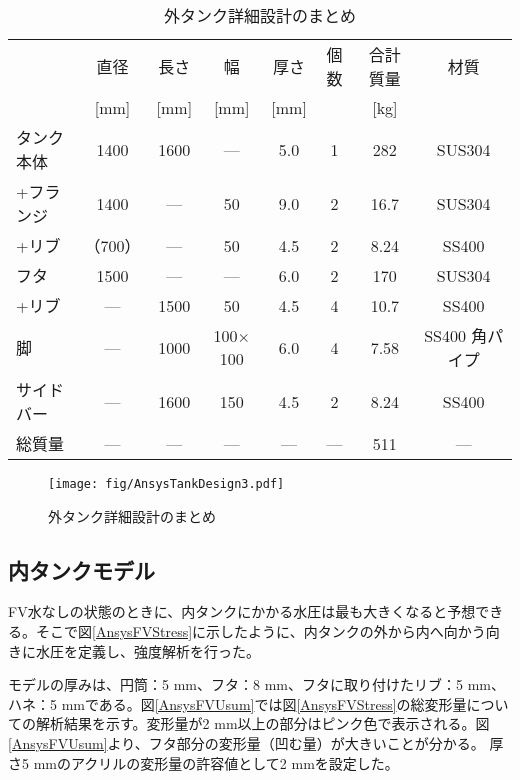 \documentclass[11pt]{ltjsreport}
\newcommand{\figref}[1]{図\ref{#1}}
\begin{document}
\begin{table}[!h]
\caption[外タンク詳細設計のまとめ]{外タンク詳細設計のまとめ}
\begin{center}
\begin{tabular}{lccccccc}
\hline \hline
& 直径 & 長さ & 幅 & 厚さ & 個数 & 合計質量 & 材質 \\
& [mm] & [mm] & [mm] & [mm] &  & [kg] &  \\
\hline
タンク本体 & 1400 & 1600 & --- & 5.0 & 1 & 282 &  SUS304\\
+フランジ & 1400 & --- & 50 & 9.0 & 2 & 16.7 & SUS304\\
+リブ & （700）& --- & 50 & 4.5 & 2 & 8.24 &SS400\\
\hline
フタ & 1500 & --- & --- & 6.0 & 2 & 170 & SUS304 \\
+リブ & --- & 1500 & 50 & 4.5 & 4 & 10.7& SS400\\
\hline
脚 & --- & 1000 & 100$\times$100 & 6.0 & 4 & 7.58 & SS400 角パイプ\\
サイドバー & --- & 1600 & 150 & 4.5 & 2 & 8.24 & SS400\\
\hline
総質量 & --- & --- & --- & --- & --- & 511 & ---\\
\hline \hline
\end{tabular}
\end{center}
\label{TableAnsysTankDesign}
\end{table}%

\begin{figure}[!h]
\centering
\texttt{[image: fig/AnsysTankDesign3.pdf]}
\caption[外タンク詳細設計のまとめ]{外タンク詳細設計のまとめ}
\label{AnsysTankDesign}
\end{figure}

\subsection{内タンクモデル}
FV水なしの状態のときに、内タンクにかかる水圧は最も大きくなると予想できる。そこで\figref{AnsysFVStress}に示したように、内タンクの外から内へ向かう向きに水圧を定義し、強度解析を行った。

モデルの厚みは、円筒：5 mm、フタ：8 mm、フタに取り付けたリブ：5 mm、ハネ：5 mmである。\figref{AnsysFVUsum}では\figref{AnsysFVStress}の総変形量についての解析結果を示す。変形量が2 mm以上の部分はピンク色で表示される。\figref{AnsysFVUsum}より、フタ部分の変形量（凹む量）が大きいことが分かる。
厚さ5 mmのアクリルの変形量の許容値として2 mmを設定した。
\end{document}
